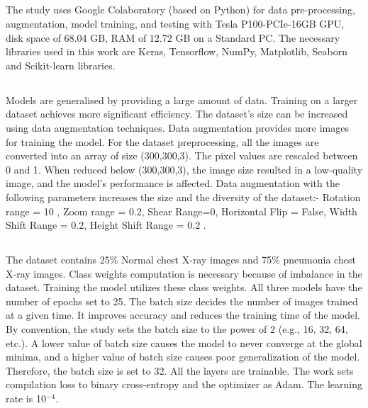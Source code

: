\documentclass[conference]{IEEEtran}
\begin{document}
\subsection{}
The study uses Google Colaboratory (based on Python) for data pre-processing, augmentation, model training, and testing with Tesla P100-PCIe-16GB GPU, disk space of 68.04 GB, RAM of 12.72 GB on a Standard PC. The necessary libraries used in this work are Keras, Tensorflow, NumPy, Matplotlib, Seaborn and Scikit-learn libraries.

\subsection{}
Models are generalised by providing a large amount of data. Training on a larger dataset achieves more significant efficiency. The dataset's size can be increased using data augmentation techniques. Data augmentation  provides more images for training the model. For the dataset preprocessing, all the images are converted into an array of size (300,300,3). The pixel values are rescaled  between 0 and 1. When reduced below (300,300,3), the image size resulted in a low-quality image, and the model’s performance is affected.
Data augmentation with the following parameters increases the size and the diversity of the dataset:-
Rotation range = 10 , Zoom range = 0.2, Shear Range=0, Horizontal Flip = False, Width Shift Range = 0.2, Height Shift Range = 0.2 .


\subsection{}
The dataset contains 25\% Normal chest X-ray images and 75\% pneumonia chest X-ray images. Class weights computation is necessary because of imbalance in the dataset. Training the model utilizes these class weights. All three models have the number of epochs set to 25. The batch size decides the number of images trained at a given time. It improves accuracy and reduces the training time of the model. By convention, the study sets the batch size to the power of 2 (e.g., 16, 32, 64, etc.). A lower value of batch size causes the model to never converge at the global minima, and a higher value of batch size causes poor generalization of the model. Therefore, the batch size is set to 32. All the layers are trainable. The work sets compilation loss to  binary cross-entropy and the optimizer as Adam. The learning rate is  10$^{-4}$. 
\end{document}
